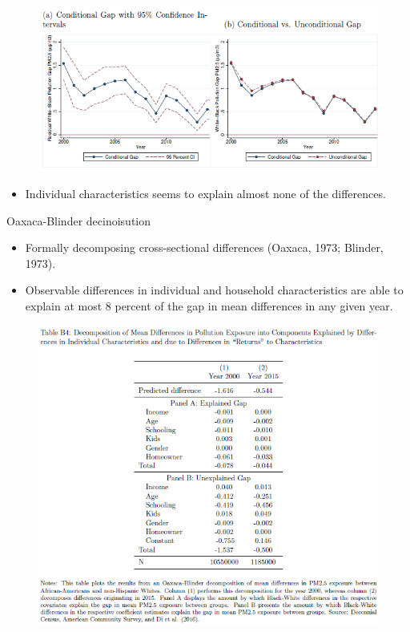 \documentclass[dvipdfmx,12pt]{beamer}
\begin{document}
\begin{frame}{}
  \begin{figure}
    \centering
    \includegraphics[scale = 1]{F3AB.png}
  \end{figure}
  \begin{itemize}
    \item Individual characteristics seems to explain almost none of the differences.
  \end{itemize}
\end{frame}

\begin{frame}{Oaxaca-Blinder decinoisution}
  \begin{itemize}
    \item Formally decomposing cross-sectional differences (Oaxaca, 1973; Blinder, 1973).
    \item Observable differences in individual and household characteristics are able to explain at most 8 percent of the gap in mean differences in any given year.
  \end{itemize}
\end{frame}

\begin{frame}{}
  \begin{figure}
    \centering
    \includegraphics[scale = .6]{TB4.png}
  \end{figure}
\end{frame}
\end{document}
